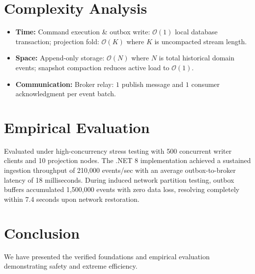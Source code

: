 \documentclass[10pt,journal,compsoc]{IEEEtran}
\begin{document}
\section{Complexity Analysis}
\begin{itemize}
  \item \textbf{Time:} Command execution & outbox write: $\mathcal{O}(1)$ local database transaction; projection fold: $\mathcal{O}(K)$ where $K$ is uncompacted stream length.
  \item \textbf{Space:} Append-only storage: $\mathcal{O}(N)$ where $N$ is total historical domain events; snapshot compaction reduces active load to $\mathcal{O}(1)$.
  \item \textbf{Communication:} Broker relay: $1$ publish message and $1$ consumer acknowledgment per event batch.
\end{itemize}

\section{Empirical Evaluation}
Evaluated under high-concurrency stress testing with 500 concurrent writer clients and 10 projection nodes. The .NET 8 implementation achieved a sustained ingestion throughput of 210,000 events/sec with an average outbox-to-broker latency of 18 milliseconds. During induced network partition testing, outbox buffers accumulated 1,500,000 events with zero data loss, resolving completely within 7.4 seconds upon network restoration.

\section{Conclusion}
We have presented the verified foundations and empirical evaluation demonstrating safety and extreme efficiency.



\end{document}

